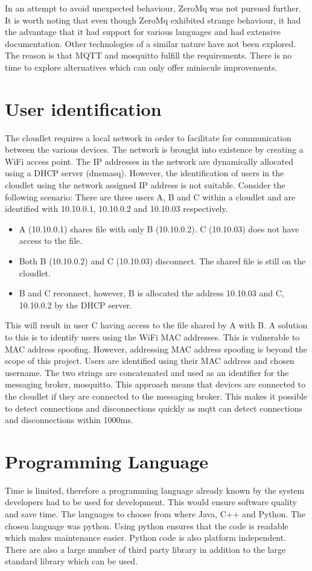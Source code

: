 In an attempt to avoid unexpected behaviour, ZeroMq was not pursued further. It is worth noting that even though ZeroMq exhibited strange behaviour, it had the advantage that it had support for various languages
and had extensive documentation. Other technologies of a similar nature have not been explored. The reason is that MQTT and mosquitto fulfill the requirements. There is no time to explore alternatives which can only offer miniscule improvements.

\section{User identification}

The cloudlet requires a local network in order to facilitate for communication between the various devices. The network is brought into existence by creating a WiFi access point. The IP addresses in the network are
dynamically allocated using a DHCP server (dnsmasq). However, the identification of users in the cloudlet using the network assigned IP address is not suitable. Consider the following scenario: There are three users
A, B and C within a cloudlet and are identified with 10.10.0.1, 10.10.0.2 and 10.10.03 respectively.
\begin{itemize}
\item A (10.10.0.1) shares file with only B (10.10.0.2). C (10.10.03) does not have access to the file.
\item Both B (10.10.0.2) and C (10.10.03) disconnect. The shared file is still on the cloudlet.
\item B and C reconnect, however, B is allocated the address 10.10.03 and C, 10.10.0.2 by the DHCP server.
\end{itemize}
This will result in user C having access to the file shared by A with B. A solution to this is to identify users using the WiFi MAC addresses. This is vulnerable to MAC address spoofing. However, addressing MAC address
spoofing is beyond the scope of this project. Users are identified using their MAC address and chosen username. The two strings are concatenated and used as an identifier for the messaging broker, mosquitto. This approach means that devices are connected to the cloudlet if they are connected to the messaging broker. This makes it possible to detect connections and disconnections quickly as mqtt can detect connections and disconnections within 1000ms.

\section{Programming Language}
Time is limited, therefore a programming language already known by the system developers had to be used for development. This would ensure software quality and save time. The languages to choose from where Java, C++ and
Python. The chosen language was python. Using python ensures that the code is readable which makes maintenance easier. Python code is also platform independent. There are also a large number of third party library in addition
to the large standard library which can be used.

